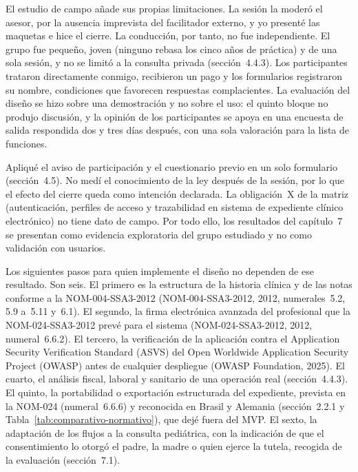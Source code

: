 \documentclass[12pt, a4paper]{article}
\begin{document}
El estudio de campo añade sus propias limitaciones. La sesión la moderó
el asesor, por la ausencia imprevista del facilitador
externo, y yo presenté las maquetas e hice el cierre. La
conducción, por tanto, no fue independiente. El grupo fue pequeño, joven
(ninguno rebasa los cinco años de práctica) y de una sola sesión, y no
se limitó a la consulta privada (sección~4.4.3). Los
participantes trataron directamente conmigo, recibieron un pago y los formularios
registraron su nombre, condiciones que favorecen respuestas
complacientes. La evaluación del diseño se hizo sobre una demostración y
no sobre el uso: el quinto bloque no produjo discusión, y la opinión de los participantes se apoya en una encuesta de salida respondida dos y tres
días después, con una sola valoración para la lista de funciones.

Apliqué el aviso de participación y el cuestionario previo en un
solo formulario (sección~4.5). No medí el conocimiento de la ley después de la sesión, por lo que el efecto del cierre queda como
intención declarada. La obligación~X de la matriz (autenticación, perfiles de acceso y trazabilidad en sistema de expediente clínico electrónico) no tiene dato de campo. Por todo
ello, los resultados del capítulo~7 se presentan como evidencia
exploratoria del grupo estudiado y no como validación con usuarios.
 
Los siguientes pasos para quien implemente el diseño no dependen de ese
resultado. Son seis. El primero es la
estructura de la historia clínica y de las notas conforme a la
NOM-004-SSA3-2012 (NOM-004-SSA3-2012, 2012, numerales~5.2, 5.9 a~5.11
y~6.1). El segundo, la firma electrónica avanzada del profesional que la
NOM-024-SSA3-2012 prevé para el sistema (NOM-024-SSA3-2012, 2012,
numeral~6.6.2). El tercero, la verificación de la aplicación contra el
Application Security Verification Standard (ASVS) del Open Worldwide
Application Security Project (OWASP) antes de cualquier despliegue
(OWASP Foundation, 2025). El cuarto, el análisis fiscal, laboral y
sanitario de una operación real (sección~4.4.3). El quinto, la
portabilidad o exportación estructurada del expediente, prevista en la
NOM-024 (numeral~6.6.6) y reconocida en Brasil y Alemania (sección~2.2.1
y Tabla~\ref{tab:comparativo-normativo}), que dejé fuera
del MVP. El sexto, la adaptación de los flujos
a la consulta pediátrica, con la indicación de que el consentimiento lo
otorgó el padre, la madre o quien ejerce la tutela, recogida de la
evaluación (sección~7.1).
 
\end{document}
